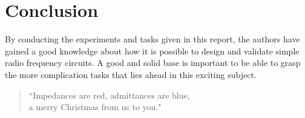 \documentclass[report.tex]{subfiles}
\begin{document}
\pagebreak \section{Conclusion}
By conducting the experiments and tasks given in this report, the authors have gained a good knowledge about how it is possible to design and validate simple radio frequency circuits. A good and solid base is important to be able to grasp the more complication tasks that lies ahead in this exciting subject.

\begin{quote}
``Impedances are red, admittances are blue,\\
a merry Christmas from us to you."
\end{quote}
\end{document}
